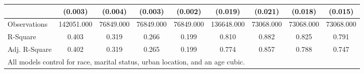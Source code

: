 \begin{table}
\begin{tabular}{l*{8}{c}}
                    &     (0.003)         &     (0.004)         &     (0.003)         &     (0.002)         &     (0.019)         &     (0.021)         &     (0.018)         &     (0.015)         \\
\hline
Observations        &  142051.000         &   76849.000         &   76849.000         &   76849.000         &  136648.000         &   73068.000         &   73068.000         &   73068.000         \\
R-Square            &       0.403         &       0.319         &       0.266         &       0.199         &       0.810         &       0.882         &       0.825         &       0.791         \\
Adj. R-Square       &       0.402         &       0.319         &       0.265         &       0.199         &       0.774         &       0.857         &       0.788         &       0.747         \\
\hline
\multicolumn{9}{l}{\small{All models control for race, marital status, urban location, and an age cubic.}} \\
\end{tabular}
\end{table}
